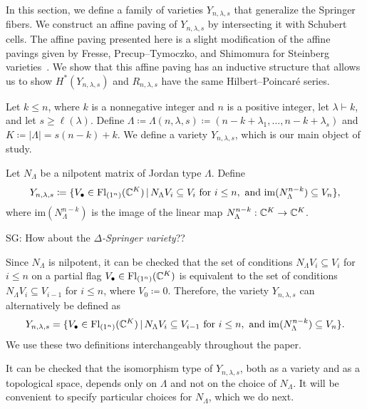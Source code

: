 \documentclass[12pt]{amsart}
\newcommand{\st}{\,|\,}
\newcommand{\Fl}{\mathrm{Fl}}
\newcommand{\la}{\lambda}
\newcommand{\im}{\mathrm{im}}
\newcommand{\SG}[1]{{\color{red} SG: #1}}
\begin{document}
In this section, we define a family of varieties $Y_{n,\lambda,s}$ that generalize the Springer fibers. We construct an affine paving of $Y_{n,\lambda,s}$ by intersecting it with Schubert cells. The affine paving presented here is a slight modification of the affine pavings given by Fresse, Precup--Tymoczko, and Shimomura for Steinberg varieties~\cite{Fresse,Precup-Tymoczko-Parabolic,Shimomura}. We show that this affine paving has an inductive structure that allows us to show $H^*(Y_{n,\lambda,s})$ and $R_{n,\lambda,s}$ have the same Hilbert--Poincar\'e series.

Let $k\leq n$, where $k$ is a nonnegative integer and $n$ is a positive integer, let $\la\vdash k$, and let $s\geq \ell(\la)$. Define $\Lambda \coloneqq \Lambda(n,\lambda,s) \coloneqq (n-k+\lambda_1,\ldots,n-k+\lambda_s)$ and $K\coloneqq |\Lambda|=s(n-k)+k$. We define a variety $Y_{n,\la,s}$, which is our main object of study.
\begin{definition}
Let $N_\Lambda$ be a nilpotent matrix of Jordan type $\Lambda$. Define
\begin{align}
    Y_{n,\la,s}\coloneqq \{V_\bullet \in \Fl_{(1^n)}(\bC^K)\st N_\Lambda V_i\subseteq V_i\text{ for }i\leq n,\text{ and }\im(N_\Lambda^{n-k})\subseteq V_n\},
\end{align}
where $\im(N_\Lambda^{n-k})$ is the image of the linear map $N_\Lambda^{n-k}: \mathbb{C}^K\to \mathbb{C}^K$.
\end{definition}

\SG{How about the \emph{$\Delta$-Springer variety}??}

\begin{remark}
Since $N_\Lambda$ is nilpotent, it can be checked that the set of conditions $N_\Lambda V_i\subseteq V_i$ for $i\leq n$ on a partial flag $V_\bullet\in \Fl_{(1^n)}(\bC^K)$ is equivalent to the set of conditions $N_\Lambda V_i\subseteq V_{i-1}$ for $i\leq n$, where $V_0\coloneqq 0$. Therefore, the variety $Y_{n,\la,s}$ can alternatively be defined as
\begin{align}
    Y_{n,\la,s} = \{V_\bullet \in \Fl_{(1^n)}(\bC^K) \st N_\Lambda V_i\subseteq V_{i-1} \text{ for }i\leq n,\text{ and }\im(N_\Lambda^{n-k})\subseteq V_n\}.
\end{align}
We use these two definitions interchangeably throughout the paper.
\end{remark}
It can be checked that the isomorphism type of $Y_{n,\la,s}$, both as a variety and as a topological space, depends only on $\Lambda$ and not on the choice of $N_\Lambda$. It will be convenient to specify particular choices for $N_\Lambda$, which we do next. 
\end{document}
